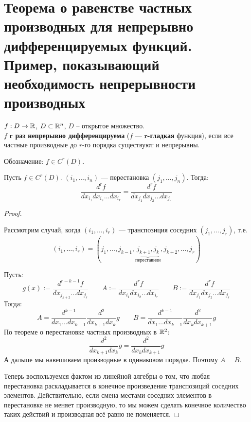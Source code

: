 \section{Теорема о равенстве частных производных для непрерывно дифференцируемых функций. Пример, показывающий необходимость непрерывности производных }

\begin{conj}
    $f : D \to \mathbb{R}$, $D \subset \mathbb{R}^n$, $D$ -- открытое множество. \\
    $f$ \textbf{$\mathbf{r}$ раз непрерывно дифференцируема} 
    ($f$ --- \textbf{$\mathbf{r}$-гладкая} функция), если 
    все частные производные до $r$-го порядка существуют и
    непрерывны.

    Обозначение: $f \in C^r(D)$.
\end{conj}

\begin{theorem}
    Пусть $f \in C^r(D)$. $(i_1, \dots, i_n)$ --- перестановка 
    $(j_1, \dots, j_n)$. Тогда:
    $$ \frac{d^r f}{d x_{i_1} d x_{i_2} \dots d x_{i_r}} = 
    \frac{d^r f}{d x_{j_1} d x_{j_2} \dots d x_{j_r}} $$
\end{theorem}
\begin{proof} $ $

    Рассмотрим случай, когда $(i_1, \dots, i_r)$ --- транспозиция
    соседних $(j_1, \dots, j_r)$, т.е. 
    $$(i_1, \dots, i_r) = (j_1, \dots, j_{k - 1}, 
    \underbrace{j_{k + 1}, j_k}_{\text{переставили}}, 
    j_{k + 2}, \dots, j_r)$$

    Пусть:
    $$ g(x) := \frac{d^{r - k - 1} f}{d x_{j_{k + 2}} \dots d x_{j_r}}
    \quad \quad
    A := \frac{d^r f}{d x_{i_1} d x_{i_2} \dots d x_{i_r}} \quad
    \quad B := \frac{d^r f}{d x_{j_1} d x_{j_2} \dots d x_{j_r}} $$
    Тогда:
    $$ A = \frac{d^{k-1}}{d x_1 \dots d x_{k-1}} 
    \frac{d^{2}}{d x_{k+1} d x_{k}} g \quad \quad 
    B = \frac{d^{k-1}}{d x_1 \dots d x_{k-1}} 
    \frac{d^{2}}{d x_{k} d x_{k+1}} g$$
    По теореме о перестановке частных производных в $\mathbb{R}^2$:
    $$ \frac{d^{2}}{d x_{k+1} d x_{k}} g = 
    \frac{d^{2}}{d x_{k} d x_{k+1}} g $$
    А дальше мы навешиваем производные в одинаковом порядке.
    Поэтому $A = B$.

    Теперь воспользуемся фактом из линейной алгебры о том, что любая
    перестановка раскладывается в конечное произведение транспозиций
    соседних элементов. Действительно, если смена местами соседних
    элементов в перестановке не меняет производную, 
    то мы можем сделать конечное
    количество таких действий и производная всё равно не поменяется.
\end{proof}